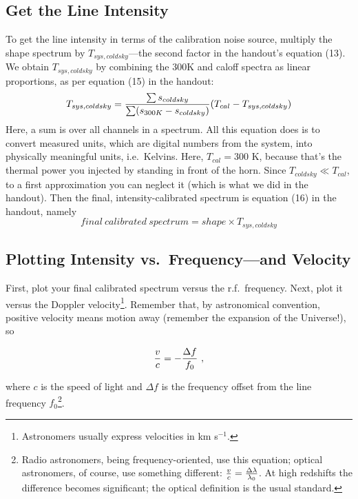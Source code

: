 \documentclass[12pt,preprint]{aastex}
\begin{document}
\subsection{Get the Line Intensity}

To get the line intensity in terms of the calibration noise source,
multiply the shape spectrum by $T_{sys,coldsky}$---the second factor in
the handout's equation (13). We obtain $T_{sys, coldsky}$ by combining
the 300K and caloff spectra as linear proportions, as per equation (15)
in the handout:
%
\begin{equation}
T_{sys, coldsky} = {\sum s_{coldsky} \over \sum(s_{300K} -
  s_{coldsky})} (T_{cal}- T_{sys,coldsky})
\end{equation}
\noindent Here, a sum is over all channels in a spectrum. All this
equation does is to convert measured units, which are digital numbers
from the system, into physically meaningful units, i.e.\ Kelvins. Here,
$T_{cal} = 300$ K, because that's the thermal power you injected by
standing in front of the horn. Since $T_{coldsky} \ll
T_{cal}$, to a first approximation you can neglect it (which is what we
did in the handout). Then the final, intensity-calibrated spectrum is
equation (16) in the handout, namely
\begin{equation}
final \ calibrated \ spectrum = shape \times T_{sys, coldsky}
\end{equation}
%
\subsection{Plotting Intensity vs.\ Frequency---and Velocity} First,
plot your final calibrated spectrum versus the r.f.\ frequency. Next,
plot it versus the Doppler velocity\footnote{Astronomers usually express
  velocities in km s$^{-1}$.}.  Remember that, by astronomical
convention, positive velocity means motion away (remember the expansion
of the Universe!), so

\begin{equation}
{v \over c} = -{\Delta f \over f_0} \ ,
\end{equation}

\noindent where $c$ is the speed of light and $\Delta f$ is the frequency
offset from the line frequency $f_0$\footnote{Radio astronomers, being
  frequency-oriented, use this equation; optical astronomers, of course,
  use something different: ${v \over c} = {\Delta \lambda \over
    \lambda_0}$. At high redshifts the difference becomes significant;
  the optical definition is the usual standard.}. 
\end{document}
